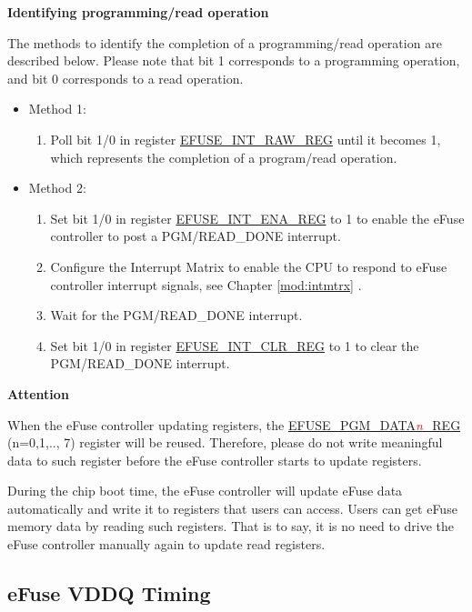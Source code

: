 \documentclass[main\_\_EN.tex]{subfiles}
\begin{document}
{\bfseries Identifying programming/read operation}

The methods to identify the completion of a programming/read operation are described below. Please note that bit 1 corresponds to a programming operation, and bit 0 corresponds to a read operation.
\begin{itemize}

    \item Method 1:
        \begin{enumerate}
            \item Poll bit 1/0 in register \hyperref[regdesc:EFUSEINTRAWREG]{EFUSE\_INT\_RAW\_REG} until it becomes 1, which represents the completion of a program/read operation.
        \end{enumerate}
    \item Method 2:
        \begin{enumerate}
            \item Set bit 1/0 in register \hyperref[regdesc:EFUSEINTENAREG]{EFUSE\_INT\_ENA\_REG} to 1 to enable the eFuse controller to post a PGM/READ\_DONE interrupt.
            \item Configure the Interrupt Matrix to enable the CPU to respond to eFuse controller interrupt signals, see Chapter \ref{mod:intmtrx} \textit{}.
            \item Wait for the PGM/READ\_DONE interrupt.
            \item Set bit 1/0 in register \hyperref[regdesc:EFUSEINTCLRREG]{EFUSE\_INT\_CLR\_REG} to 1 to clear the PGM/READ\_DONE interrupt.
    \end{enumerate}
\end{itemize}

{\bfseries Attention}

When the eFuse controller updating registers, the \hyperref[regdesc:EFUSEPGMDATA0REG]{EFUSE\_PGM\_DATA\textcolor{red}{\it{n}}\_REG} (n=0,1,.., 7) register will be reused. Therefore, please do not write meaningful data to such register before the eFuse controller starts to update registers.

During the chip boot time, the eFuse controller will update eFuse data automatically and write it to registers that users can access. Users can get eFuse memory data by reading such registers. That is to say, it is no need to drive the eFuse controller manually again to update read registers.

\subsection{eFuse VDDQ Timing}
\label{sec:efuse-vddq-timing}
\end{document}
